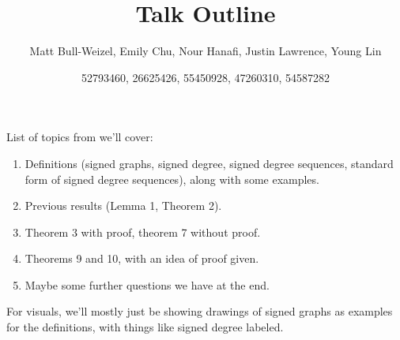 \documentclass[12pt]{article}
\title{Talk Outline}
\author{Matt Bull-Weizel, Emily Chu, Nour Hanafi, Justin Lawrence, Young Lin}
\date{52793460, 26625426, 55450928, 47260310, 54587282}
\begin{document}
\maketitle

List of topics from \cite{MR1469358} we'll cover:

\begin{enumerate}
    \item Definitions (signed graphs, signed degree, signed degree sequences, standard form of signed degree sequences), along with some examples.
    \item Previous results (Lemma 1, Theorem 2).
    \item Theorem 3 with proof, theorem 7 without proof.
    \item Theorems 9 and 10, with an idea of proof given.
    \item Maybe some further questions we have at the end.
\end{enumerate}

For visuals, we'll mostly just be showing drawings of signed graphs as examples for the definitions, with things like signed degree labeled.



\end{document}

